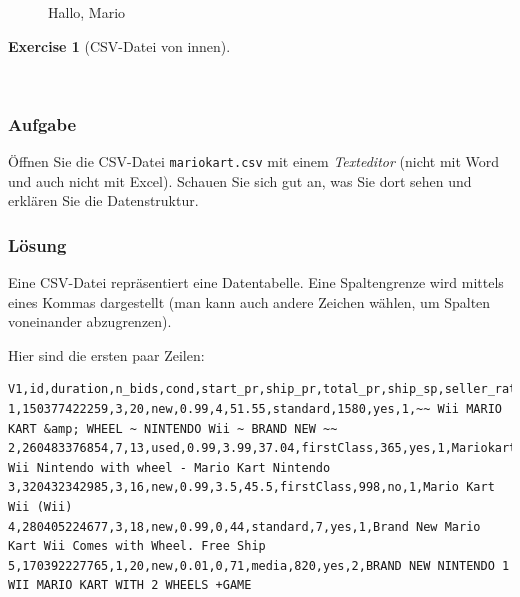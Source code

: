 \documentclass[
  letterpaper,
  DIV=11,
  numbers=noendperiod]{scrartcl}
\theoremstyle{definition}
\newtheorem{exercise}{Exercise}[section]
\theoremstyle{definition}
\theoremstyle{definition}
\theoremstyle{remark}
\begin{document}
\begin{figure}


\caption{\label{fig-mario}Hallo, Mario}

\end{figure}%

\begin{exercise}[CSV-Datei von
innen]\protect\hypertarget{exr-texteditor}{}\label{exr-texteditor}

~

\subsubsection{Aufgabe}

Öffnen Sie die CSV-Datei \texttt{mariokart.csv} mit einem
\emph{Texteditor} (nicht mit Word und auch nicht mit Excel). Schauen Sie
sich gut an, was Sie dort sehen und erklären Sie die Datenstruktur.

\subsubsection{Lösung}

Eine CSV-Datei repräsentiert eine Datentabelle. Eine Spaltengrenze wird
mittels eines Kommas dargestellt (man kann auch andere Zeichen wählen,
um Spalten voneinander abzugrenzen).

Hier sind die ersten paar Zeilen:

\begin{verbatim}
V1,id,duration,n_bids,cond,start_pr,ship_pr,total_pr,ship_sp,seller_rate,stock_photo,wheels,title
1,150377422259,3,20,new,0.99,4,51.55,standard,1580,yes,1,~~ Wii MARIO KART &amp; WHEEL ~ NINTENDO Wii ~ BRAND NEW ~~
2,260483376854,7,13,used,0.99,3.99,37.04,firstClass,365,yes,1,Mariokart Wii Nintendo with wheel - Mario Kart Nintendo
3,320432342985,3,16,new,0.99,3.5,45.5,firstClass,998,no,1,Mario Kart Wii (Wii)
4,280405224677,3,18,new,0.99,0,44,standard,7,yes,1,Brand New Mario Kart Wii Comes with Wheel. Free Ship
5,170392227765,1,20,new,0.01,0,71,media,820,yes,2,BRAND NEW NINTENDO 1 WII MARIO KART WITH 2 WHEELS +GAME
\end{verbatim}

\end{exercise}
\end{document}
